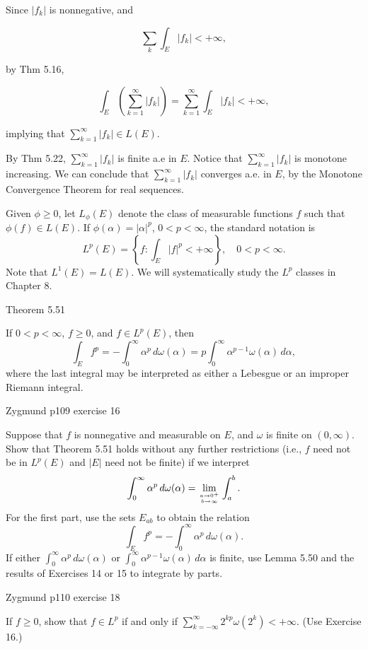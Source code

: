 \documentclass[UTF8,a4paper,10pt]{article}
\begin{document}
Since 
\(|f_k|\) is nonnegative, and

\[\sum_{k} \int_E |f_k| < +\infty,\]

by Thm 5.16,

\[
  \int_E \left(\sum_{k=1}^{\infty} |f_k| \right) = \sum_{k=1}^{\infty} \int_E |f_k| <  +\infty,
\]

implying that \(  \sum_{k=1}^{\infty} |f_k| \in L(E)\).


By Thm 5.22, \( \sum_{k=1}^{\infty} |f_k| \) is finite a.e in \(E\). Notice that \( \sum_{k=1}^{\infty} |f_k|\) is monotone increasing. We can conclude that \( \sum_{k=1}^{\infty} |f_k|\) converges a.e. in \(E\), by the Monotone Convergence Theorem for real sequences.






\pagebreak


\begin{mybox}{}
Given $\phi \geq 0$, let $L_{\phi}(E)$ denote the class of measurable functions $f$ such that $\phi(f) \in L(E)$. If $\phi(\alpha) = |\alpha|^p$, $0 < p < \infty$, the standard notation is
\[
L^p(E) = \left\{ f : \int_{E} |f|^p < +\infty \right\}, \quad 0 < p < \infty.
\]
Note that $L^1(E) = L(E)$. We will systematically study the $L^p$ classes in Chapter 8.

\end{mybox}


\begin{mybox}{Theorem 5.51}
  
If $0 < p < \infty$, $f \geq 0$, and $f \in L^p(E)$, then
\[
\int_{E} f^p = -\int_{0}^{\infty} \alpha^p \, d\omega(\alpha) = p \int_{0}^{\infty} \alpha^{p-1} \omega(\alpha) \, d\alpha,
\]
where the last integral may be interpreted as either a Lebesgue or an improper Riemann integral.

\end{mybox}

\begin{Problem}[]{Zygmund p109 exercise 16}

  Suppose that $f$ is nonnegative and measurable on $E$, and $\omega$ is finite on $(0, \infty)$. Show that Theorem 5.51 holds without any further restrictions (i.e., $f$ need not be in $L^p(E)$ and $|E|$ need not be finite) if we interpret
  \[
  \int_{0}^{\infty} \alpha^p \, d\omega(\alpha) = \lim_{{a \to 0^+}\atop{b \to \infty}} \int_{a}^{b} .
  \]
  For the first part, use the sets $E_{ab}$ to obtain the relation
  \[
  \int_{E} f^p = -\int_{0}^{\infty} \alpha^p \, d\omega(\alpha).
  \]
  If either $\int_{0}^{\infty} \alpha^p \, d\omega(\alpha)$ or $\int_{0}^{\infty} \alpha^{p-1} \omega(\alpha) \, d\alpha$ is finite, use Lemma 5.50 and the results of Exercises 14 or 15 to integrate by parts.
  
  \end{Problem}


  \begin{Problem}[]{Zygmund p110 exercise 18}

    If $f \geq 0$, show that $f \in L^p$ if and only if $\sum_{k=-\infty}^{\infty} 2^{kp} \omega(2^k) < +\infty$. (Use Exercise 16.)


    \end{Problem}
  
\end{document}
